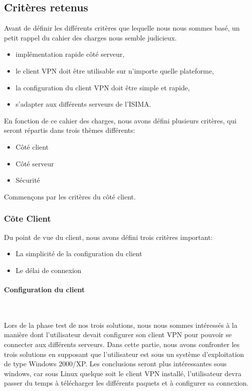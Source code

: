 \subsection{Critères retenus}

Avant de définir les différents critères que lequelle nous nous sommes basé, un petit rappel du cahier des charges nous semble judicieux.


\begin{itemize}
 	\item implémentation rapide côté serveur,
	\item le client VPN doit être utilisable sur n'importe quelle plateforme,
	\item la configuration du client VPN doit être simple et rapide,
	\item s'adapter aux différents serveurs de l'ISIMA.
\end{itemize}


En fonction de ce cahier des charges, nous avons défini plusieurs critères, qui seront répartis dans trois thèmes différents:

\begin{itemize}
 	\item Côté client 
 	\item Côté serveur
 	\item Sécurité
\end{itemize}

 Commençons par les critères du côté client. 


\subsubsection{Côte Client}

Du point de vue du client, nous avons défini trois critères important:
\begin{itemize}
 	\item La simplicité de la configuration du client
	\item Le délai de connexion
\end{itemize}

\paragraph{Configuration du client}
~


Lors de la phase test de nos trois solutions, nous nous sommes intéressés à la manière dont l'utilisateur devait configurer son client VPN pour pouvoir se connecter aux différents serveurs. Dans cette partie, nous avons confronter les trois solutions en supposant que l'utilisateur est sous un système d'exploitation de type Windows 2000/XP. Les conclusions seront plus intéressantes sous windows, car sous Linux quelque soit le client VPN installé, l'utilisateur devra passer du temps à télécharger les différents paquets et à configurer sa connexion.

